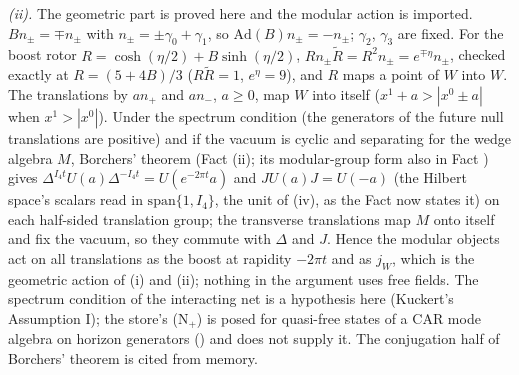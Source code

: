 \emph{(ii).} The geometric part is proved here and the modular action is imported. $Bn_{\pm} = \mp n_{\pm}$ with $n_{\pm} = \pm\gamma_{0} + \gamma_{1}$, so $\mathrm{Ad}(B)n_{\pm} = -n_{\pm}$; $\gamma_{2}$, $\gamma_{3}$ are fixed. For the boost rotor $R = \cosh(\eta/2) + B\sinh(\eta/2)$, $R n_{\pm}\tilde R = R^{2}n_{\pm} = e^{\mp\eta}n_{\pm}$, checked exactly at $R = (5 + 4B)/3$ ($R\tilde R = 1$, $e^{\eta} = 9$), and $R$ maps a point of $W$ into $W$. The translations by $a n_{+}$ and $a n_{-}$, $a \ge 0$, map $W$ into itself ($x^{1} + a > |x^{0} \pm a|$ when $x^{1} > |x^{0}|$). Under the spectrum condition (the generators of the future null translations are positive) and if the vacuum is cyclic and separating for the wedge algebra $M$, Borchers' theorem \cite{Borchers1992} (Fact (ii); its modular-group form also in Fact ) gives $\Delta^{I_{4}t}U(a)\Delta^{-I_{4}t} = U(e^{-2\pi t}a)$ and $JU(a)J = U(-a)$ (the Hilbert space's scalars read in $\mathrm{span}\{1, I_{4}\}$, the unit of (iv), as the Fact now states it) on each half-sided translation group; the transverse translations map $M$ onto itself and fix the vacuum, so they commute with $\Delta$ and $J$. Hence the modular objects act on all translations as the boost at rapidity $-2\pi t$ and as $j_{W}$, which is the geometric action of (i) and (ii); nothing in the argument uses free fields. The spectrum condition of the interacting net is a hypothesis here (Kuckert's Assumption I); the store's (N$_{+}$) is posed for quasi-free states of a CAR mode algebra on horizon generators () and does not supply it. The conjugation half of Borchers' theorem is cited from memory.

